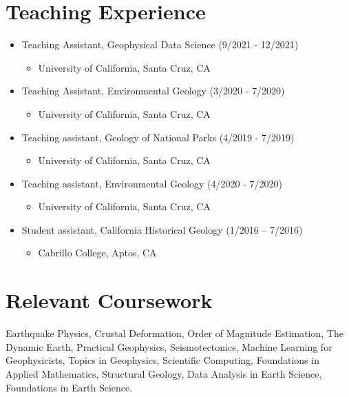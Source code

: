 \documentclass[11pt]{article}
\begin{document}
\section{Teaching Experience}
\label{sec:orgf9e2bcb}
\begin{itemize}
\item Teaching Assistant, Geophysical Data Science (9/2021 - 12/2021)
\begin{itemize}
\item University of California, Santa Cruz, CA
\end{itemize}
\item Teaching Assistant, Environmental Geology (3/2020 - 7/2020)
\begin{itemize}
\item University of California, Santa Cruz, CA
\end{itemize}
\item Teaching assistant, Geology of National Parks (4/2019 - 7/2019)
\begin{itemize}
\item University of California, Santa Cruz, CA
\end{itemize}
\item Teaching assistant, Environmental Geology (4/2020 - 7/2020)
\begin{itemize}
\item University of California, Santa Cruz, CA
\end{itemize}
\item Student assistant, California Historical Geology (1/2016 – 7/2016)
\begin{itemize}
\item Cabrillo College, Aptos, CA
\end{itemize}
\end{itemize}

\section{Relevant Coursework}
\label{sec:orgd4aded4}
Earthquake Physics, Crustal Deformation, Order of Magnitude Estimation, The Dynamic Earth, Practical Geophysics, Seismotectonics, Machine Learning for Geophysicists, Topics in Geophysics, Scientific Computing, Foundations in Applied Mathematics, Structural Geology, Data Analysis in Earth Science, Foundations in Earth Science.
\end{document}
